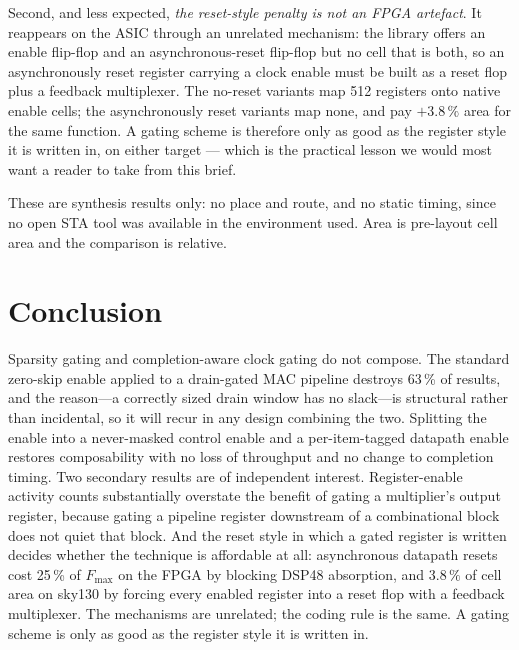 \documentclass[journal,twocolumn]{IEEEtran}
\begin{document}
Second, and less expected, \emph{the reset-style penalty is not an FPGA
artefact}. It reappears on the ASIC through an unrelated mechanism: the
library offers an enable flip-flop and an asynchronous-reset flip-flop but no
cell that is both, so an asynchronously reset register carrying a clock enable
must be built as a reset flop plus a feedback multiplexer. The no-reset
variants map 512 registers onto native enable cells; the asynchronously reset
variants map none, and pay $+3.8\,\%$ area for the same function. A gating
scheme is therefore only as good as the register style it is written in, on
either target --- which is the practical lesson we would most want a reader to
take from this brief.

These are synthesis results only: no place and route, and no static timing,
since no open STA tool was available in the environment used. Area is
pre-layout cell area and the comparison is relative.

\section{Conclusion}
Sparsity gating and completion-aware clock gating do not compose. The standard
zero-skip enable applied to a drain-gated MAC pipeline destroys 63\,\% of
results, and the reason---a correctly sized drain window has no slack---is
structural rather than incidental, so it will recur in any design combining
the two. Splitting the enable into a never-masked control enable and a
per-item-tagged datapath enable restores composability with no loss of
throughput and no change to completion timing. Two secondary results are of
independent interest. Register-enable activity counts substantially overstate
the benefit of gating a multiplier's output register, because gating a
pipeline register downstream of a combinational block does not quiet that
block. And the reset style in which a gated register is written decides
whether the technique is affordable at all: asynchronous datapath resets cost
25\,\% of $F_{\max}$ on the FPGA by blocking DSP48 absorption, and $3.8\,\%$
of cell area on sky130 by forcing every enabled register into a reset flop
with a feedback multiplexer. The mechanisms are unrelated; the coding rule is
the same. A gating scheme is only as good as the register style it is written
in.
\end{document}
